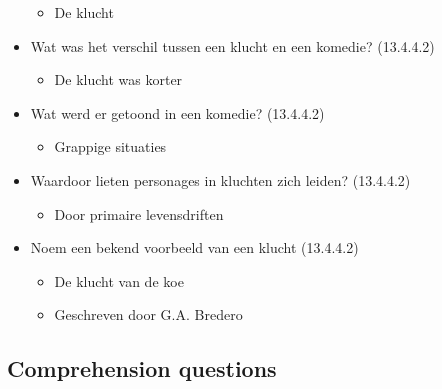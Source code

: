 \begin{itemize}
  \begin{itemize}
  \itemsep1pt\parskip0pt
  \item
    De klucht
  \end{itemize}
\item
  Wat was het verschil tussen een klucht en een komedie? (13.4.4.2)

  \begin{itemize}
  \itemsep1pt\parskip0pt
  \item
    De klucht was korter
  \end{itemize}
\item
  Wat werd er getoond in een komedie? (13.4.4.2)

  \begin{itemize}
  \itemsep1pt\parskip0pt
  \item
    Grappige situaties
  \end{itemize}
\item
  Waardoor lieten personages in kluchten zich leiden? (13.4.4.2)

  \begin{itemize}
  \itemsep1pt\parskip0pt
  \item
    Door primaire levensdriften
  \end{itemize}
\item
  Noem een bekend voorbeeld van een klucht (13.4.4.2)

  \begin{itemize}
  \itemsep1pt\parskip0pt
  \item
    De klucht van de koe
  \item
    Geschreven door G.A. Bredero
  \end{itemize}
\end{itemize}

\subsection{Comprehension questions}\label{comprehension-questions}

